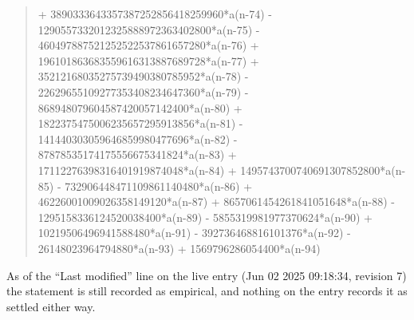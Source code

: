 \documentclass[11pt,a4paper]{article}
\theoremstyle{plain}
\theoremstyle{definition}
\begin{document}
\begin{quote}
+ 3890333643357387252856418259960*a(n-74) - 1290557332012325888972363402800*a(n-75) - 460497887521252522537861657280*a(n-76) + 196101863683559616313887689728*a(n-77) + 35212168035275739490380785952*a(n-78) - 22629655109277353408234647360*a(n-79) - 868948079604587420057142400*a(n-80) + 1822375475006235657295913856*a(n-81) - 141440303059646859980477696*a(n-82) - 87878535174175556675341824*a(n-83) + 17112276398316401919874048*a(n-84) + 1495743700740691307852800*a(n-85) - 732906448471109861140480*a(n-86) + 46226001009026358149120*a(n-87) + 8657061454261841051648*a(n-88) - 1295158336124520038400*a(n-89) - 5855319981977370624*a(n-90) + 10219506496941588480*a(n-91) - 392736468816101376*a(n-92) - 26148023964794880*a(n-93) + 1569796286054400*a(n-94)
\end{quote}
As of the ``Last modified'' line on the live entry (Jun 02 2025 09:18:34, revision 7) the statement is
still recorded as empirical, and nothing on the entry records it as settled either way.
\end{document}
